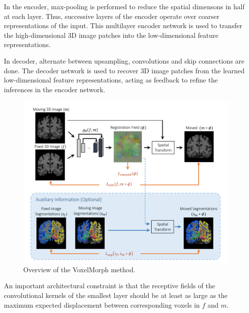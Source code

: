\documentclass{report}
\begin{document}
	In the encoder, max-pooling is performed to reduce the spatial dimensons in half at each layer. Thus, successive layers of the encoder operate over coarser representations of the input. This multilayer encoder network is used to transfer the high-dimensional 3D image patches into the low-dimensional feature representations.
	
	In decoder, alternate between upsampling, convolutions and skip connections are done. The decoder network is used to recover 3D image patches from the learned low-dimensional feature representations, acting as feedback to refine the inferences in the encoder network.
	
	\begin{figure}[h]
		\centering
		\includegraphics[width=0.9\columnwidth]{resources/chapter2/vxm.png}
		\caption{Overview of the VoxelMorph method. \cite{Balakrishnan_2019}}
		\label{fig:vxm}
	\end{figure}
	
	An important architectural constraint is that the receptive fields of the convolutional kernels of the smallest layer should be at least as large as the maximum expected displacement between corresponding voxels in $f$ and $m$.
	
\end{document}
